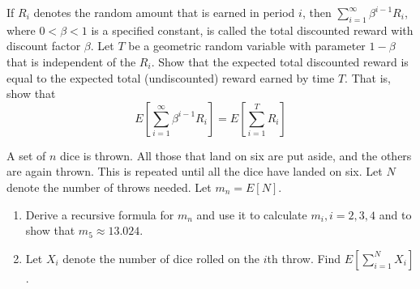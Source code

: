 \begin{exercise}
\label{ex:conditioning-expectation-33}
If $R_i$ denotes the random amount that is earned in period $i$, then $\sum_{i=1}^{\infty} \beta^{i-1}R_i$, where $0 < \beta < 1$ is a specified constant, is called the total discounted reward with discount factor $\beta$. Let $T$ be a geometric random variable with parameter $1 - \beta$ that is independent of the $R_i$. Show that the expected total discounted reward is equal to the expected total (undiscounted) reward earned by time $T$. That is, show that
\[
E\left[\sum_{i=1}^{\infty} \beta^{i-1}R_i\right] = E\left[\sum_{i=1}^{T} R_i\right]
\]
\end{exercise}


\begin{exercise}
\label{ex:conditioning-expectation-34}
A set of $n$ dice is thrown. All those that land on six are put aside, and the others are again thrown. This is repeated until all the dice have landed on six. Let $N$ denote the number of throws needed. Let $m_n = E[N]$.
\begin{enumerate}
    \item[(a)] Derive a recursive formula for $m_n$ and use it to calculate $m_i, i = 2, 3, 4$ and to show that $m_5 \approx 13.024$.
    \item[(b)] Let $X_i$ denote the number of dice rolled on the $i$th throw. Find $E\left[\sum_{i=1}^N X_i\right]$.
\end{enumerate}
\end{exercise}

